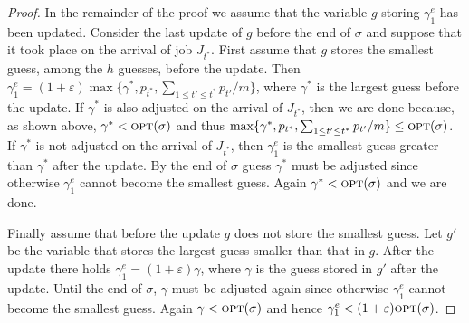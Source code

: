 \documentclass{llncs}
\newcommand{\OPT}{\text{{\sc opt}}}
\newcommand{\opt}{\OPT}
\newcommand{\eps}{\varepsilon}
\begin{document}
\begin{proof}
In the remainder of the proof we assume that the variable $g$ storing $\gamma_1^e$ has been updated. Consider 
the last update of $g$  before the end of $\sigma$ and suppose that it took place on 
the arrival of job $J_{t^*}$. First assume that $g$ stores the smallest guess, among the $h$ guesses, before 
the update. Then $\gamma_1^e = (1+\eps)\max\{\gamma^*,p_{t^*}, \sum_{1\leq t'\leq t^*} p_{t'}/m\}$, where
$\gamma^*$ is the largest guess before the update. If $\gamma^*$ is also adjusted on the arrival of $J_{t^*}$,
then we are done because, as shown above, $\gamma^* < \opt(\sigma)$ and thus
$\max\{\gamma^*,p_{t^*}, \sum_{1\leq t'\leq t^*} p_{t'}/m\} \leq \opt(\sigma)$. If $\gamma^*$ is
not adjusted on the arrival of $J_{t^*}$, then $\gamma_1^e$ is the smallest guess greater than $\gamma^*$ 
after the update. By the end of $\sigma$ guess $\gamma^*$ must be adjusted since otherwise $\gamma_1^e$ cannot
become the smallest guess. Again $\gamma^* < \opt(\sigma)$ and we are done.

Finally assume that before the update $g$ does not store the smallest guess. Let $g'$ be the variable
that stores the largest guess smaller than that in $g$. After the update there holds $\gamma_1^e = (1+\eps)\gamma$,
where $\gamma$ is the guess stored in $g'$ after the update. Until the end of $\sigma$, $\gamma$ must be
adjusted again since otherwise $\gamma_1^e$ cannot become the smallest guess. Again $\gamma <\opt(\sigma)$ and
hence $\gamma_1^e < (1+\eps)\opt(\sigma)$. \hspace*{\fill}{$\Box$}
\end{proof}
\end{document}

